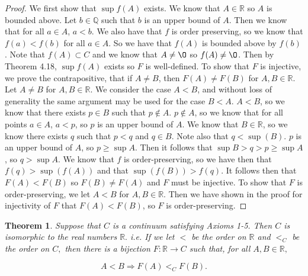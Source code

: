 \documentclass[12pt]{article}
\newcommand{\bbQ}{\mathbb{Q}}
\newcommand{\bbR}{\mathbb{R}}
\renewcommand{\emptyset}{\O}
\renewcommand{\_}[1]{\underline{ #1 }}
\newtheorem{theorem}{Theorem}[section]
\theoremstyle{definition}
\numberwithin{equation}{subsection}
\begin{document}
\begin{proof}
We first show that $\sup f(A)$ exists. We know that $A \in \bbR$ so $A$ is bounded above. Let $b \in \bbQ$ such that $b$ is an upper bound of $A$. Then we know that for all $a \in A$, $a < b$. We also have that $f$ is order preserving, so we know that $f(a) < f(b)$ for all $a \in A$. So we have that $f(A)$ is bounded above by $f(b)$. Note that $f(A) \subset C$ and we know that $A \not = \emptyset$ so $f(A) \not = \emptyset$. Then by Theorem 4.18, $\sup f(A)$ exists so $F$ is well-defined. \newline
To show that $F$ is injective, we prove the contrapositive, that if $A \not = B$, then $F(A) \not = F(B)$ for $A,B \in \bbR$. Let $A \not = B$ for $A,B \in \bbR$. We consider the case $A < B$, and without loss of generality the same argument may be used for the case $B < A$. $A < B$, so we know that there exists $p \in B$ such that $p \not \in A$. $p \not \in A$, so we know that for all points $a \in A$, $a < p$, so $p$ is an upper bound of $A$. We know that $B \in \bbR$, so we know there exists $q$ such that $p < q$ and $q \in B$. Note also that $q < \sup(B)$. $p$ is an upper bound of $A$, so $p \geq \sup A$. Then it follows that $\sup B > q > p \geq \sup A$, so $q > \sup A$. We know that $f$ is order-preserving, so we have then that $f(q) > \sup(f(A))$ and that $\sup(f(B)) > f(q)$. It follows then that $F(A) < F(B)$ so $F(B) \not = F(A)$ and $F$ must be injective. \newline
To show that $F$ is order-preserving, we let $A < B$ for $A,B \in \bbR$. Then we have shown in the proof for injectivity of $F$ that $F(A) < F(B)$, so $F$ is order-preserving. 
\end{proof}

\begin{theorem} Suppose that $C$ is a continuum satisfying Axioms 1-5. Then $C$ is isomorphic to the real numbers $\bbR.$
i.e. 
If we let $ <$ be the order on $\bbR$ and 
$<_C$ be the order on $C,$ then there is a bijection
$F:\bbR\longrightarrow C$ such that, for all $A,B\in \bbR,$  

$$A<B  \Longrightarrow  F(A)<_C F(B).$$

\end{theorem}
\end{document}
